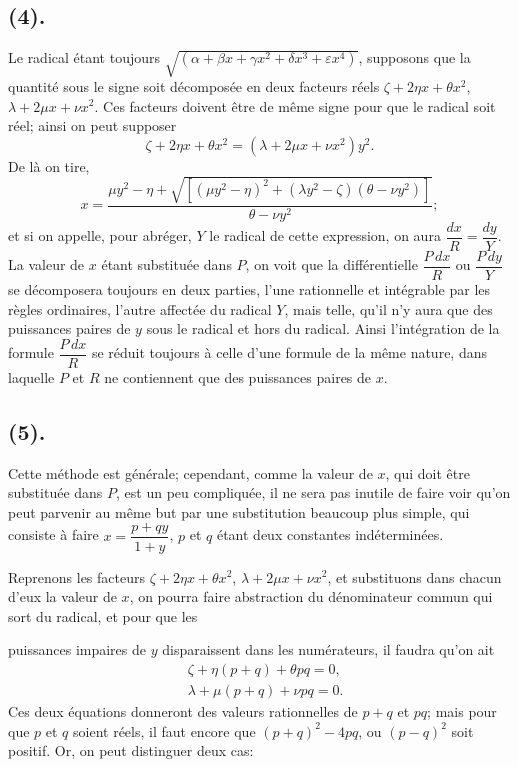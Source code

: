 \documentclass{article}
\begin{document}
\subsection*{(4).}

Le radical étant toujours $\sqrt{(\alpha+\beta x+\gamma x^{2}+\delta x^{3}+\varepsilon x^{4})}$, supposons que la quantité sous le signe soit décomposée en deux facteurs réels $\zeta+2\eta x+\theta x^{2}$, $\lambda+2\mu x+\nu x^{2}$. Ces facteurs doivent être de même signe pour que le radical soit réel; ainsi on peut supposer
\[ \zeta+2\eta x+\theta x^{2}=(\lambda+2\mu x+\nu x^{2})y^{2}. \]
De là on tire,
\[ x=\frac{\mu y^{2}-\eta+\sqrt{[(\mu y^{2}-\eta)^{2}+(\lambda y^{2}-\zeta)(\theta-\nu y^{2})]}}{\theta-\nu y^{2}}; \]
et si on appelle, pour abréger, $Y$ le radical de cette expression, on aura $\dfrac{dx}{R}=\dfrac{dy}{Y}$. La valeur de $x$ étant substituée dans $P$, on voit que la différentielle $\dfrac{P\,dx}{R}$ ou $\dfrac{P\,dy}{Y}$ se décomposera toujours en deux parties, l'une rationnelle et intégrable par les règles ordinaires, l'autre affectée du radical $Y$, mais telle, qu'il n'y aura que des puissances paires de $y$ sous le radical et hors du radical. Ainsi l'intégration de la formule $\dfrac{P\,dx}{R}$ se réduit toujours à celle d'une formule de la même nature, dans laquelle $P$ et $R$ ne contiennent que des puissances paires de $x$.

\subsection*{(5).}

Cette méthode est générale; cependant, comme la valeur de $x$, qui doit être substituée dans $P$, est un peu compliquée, il ne sera pas inutile de faire voir qu'on peut parvenir au même but par une substitution beaucoup plus simple, qui consiste à faire $x=\dfrac{p+qy}{1+y}$, $p$ et $q$ étant deux constantes indéterminées.

Reprenons les facteurs $\zeta+2\eta x+\theta x^{2}$, $\lambda+2\mu x+\nu x^{2}$, et substituons dans chacun d'eux la valeur de $x$, on pourra faire abstraction du dénominateur commun qui sort du radical, et pour que les

puissances impaires de $y$ disparaissent dans les numérateurs, il faudra qu'on ait
\[ \begin{aligned} &\zeta+\eta(p+q)+\theta pq=0,\\ &\lambda+\mu(p+q)+\nu pq=0. \end{aligned} \]
Ces deux équations donneront des valeurs rationnelles de $p+q$ et $pq$; mais pour que $p$ et $q$ soient réels, il faut encore que $(p+q)^{2}-4pq$, ou $(p-q)^{2}$ soit positif. Or, on peut distinguer deux cas:
\end{document}
